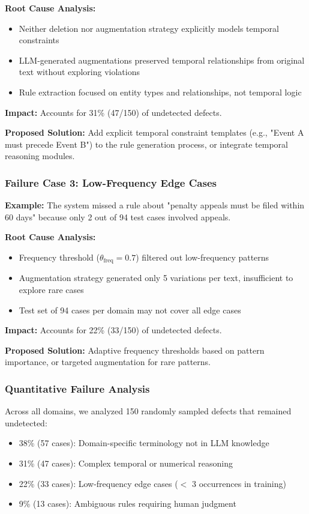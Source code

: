 \documentclass[runningheads]{llncs}
\begin{document}
\textbf{Root Cause Analysis:}
\begin{itemize}
    \item Neither deletion nor augmentation strategy explicitly models temporal constraints
    \item LLM-generated augmentations preserved temporal relationships from original text without exploring violations
    \item Rule extraction focused on entity types and relationships, not temporal logic
\end{itemize}

\textbf{Impact:} Accounts for 31\% (47/150) of undetected defects.

\textbf{Proposed Solution:} Add explicit temporal constraint templates (e.g., "Event A must precede Event B") to the rule generation process, or integrate temporal reasoning modules.

\subsubsection{Failure Case 3: Low-Frequency Edge Cases}

\textbf{Example:} The system missed a rule about "penalty appeals must be filed within 60 days" because only 2 out of 94 test cases involved appeals.

\textbf{Root Cause Analysis:}
\begin{itemize}
    \item Frequency threshold ($\theta_{\text{freq}} = 0.7$) filtered out low-frequency patterns
    \item Augmentation strategy generated only 5 variations per text, insufficient to explore rare cases
    \item Test set of 94 cases per domain may not cover all edge cases
\end{itemize}

\textbf{Impact:} Accounts for 22\% (33/150) of undetected defects.

\textbf{Proposed Solution:} Adaptive frequency thresholds based on pattern importance, or targeted augmentation for rare patterns.

\subsubsection{Quantitative Failure Analysis}

Across all domains, we analyzed 150 randomly sampled defects that remained undetected:
\begin{itemize}
    \item 38\% (57 cases): Domain-specific terminology not in LLM knowledge
    \item 31\% (47 cases): Complex temporal or numerical reasoning
    \item 22\% (33 cases): Low-frequency edge cases ($<$ 3 occurrences in training)
    \item 9\% (13 cases): Ambiguous rules requiring human judgment
\end{itemize}
\end{document}
